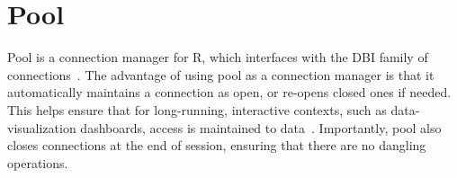 \section{Pool}

Pool is a connection manager for R, which interfaces with the DBI
family of connections~\cite{hid-sp18-403-R-dbi}. The advantage of
using pool as a connection manager is that it automatically maintains
a connection as open, or re-opens closed ones if needed. This helps
ensure that for long-running, interactive contexts, such as
data-visualization dashboards, access is maintained to
data~\cite{hid-sp18-403-R-pool}. Importantly, pool also closes
connections at the end of session, ensuring that there are no dangling
operations.
